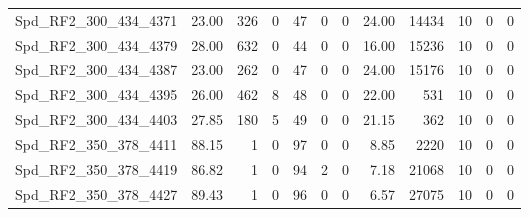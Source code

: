 \begin{longtable}[c]{@{}lrrrrrrrrrrr@{}}
Spd\_RF2\_300\_434\_4371     & 23.00                  & 326                     & 0                       & 47                     & 0                       & 0                       & 24.00                   & 14434                    & 10                       & 0                        & 0                        \\
Spd\_RF2\_300\_434\_4379     & 28.00                  & 632                     & 0                       & 44                     & 0                       & 0                       & 16.00                   & 15236                    & 10                       & 0                        & 0                        \\
Spd\_RF2\_300\_434\_4387     & 23.00                  & 262                     & 0                       & 47                     & 0                       & 0                       & 24.00                   & 15176                    & 10                       & 0                        & 0                        \\
Spd\_RF2\_300\_434\_4395     & 26.00                  & 462                     & 8                       & 48                     & 0                       & 0                       & 22.00                   & 531                      & 10                       & 0                        & 0                        \\
Spd\_RF2\_300\_434\_4403     & 27.85                  & 180                     & 5                       & 49                     & 0                       & 0                       & 21.15                   & 362                      & 10                       & 0                        & 0                        \\
Spd\_RF2\_350\_378\_4411     & 88.15                  & 1                       & 0                       & 97                     & 0                       & 0                       & 8.85                    & 2220                     & 10                       & 0                        & 0                        \\
Spd\_RF2\_350\_378\_4419     & 86.82                  & 1                       & 0                       & 94                     & 2                       & 0                       & 7.18                    & 21068                    & 10                       & 0                        & 0                        \\
Spd\_RF2\_350\_378\_4427     & 89.43                  & 1                       & 0                       & 96                     & 0                       & 0                       & 6.57                    & 27075                    & 10                       & 0                        & 0                        \\

\end{longtable}

